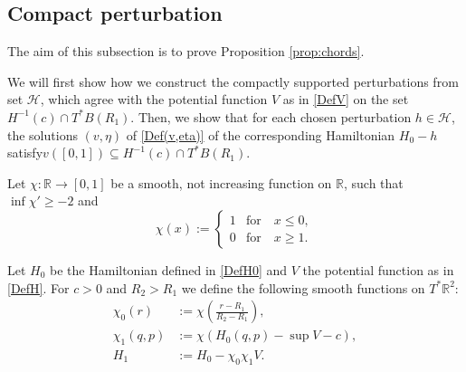 \documentclass[a4paper]{amsart}
\newtheorem{lem}[thm]{Lemma}%
\numberwithin{equation}{section}
\newcommand{\R}{\mathbb{R}}
\newcommand{\A}{\mathcal{A}}
\newcommand{\Crit}{\operatorname{Crit}}
\begin{document}
\subsection{Compact perturbation}
The aim of this subsection is to prove Proposition \ref{prop:chords}.

We will first show how we construct the compactly supported perturbations from set $\mathcal{H}$, which agree with the potential function $V$ as in \eqref{DefV} on the set\linebreak $H^{-1}(c)\cap T^*B(R_1)$. %
Then, we show that for each chosen perturbation $h\in \mathcal{H}$, the solutions $(v,\eta)$ of \eqref{Def(v,eta)} of the corresponding Hamiltonian $H_0-h$ satisfy\linebreak $v([0,1])\subseteq H^{-1}(c)\cap T^*B(R_1)$.


Let $\chi:\R \to [0,1]$ be a smooth, not increasing function on $\R$, such that\linebreak $\inf \chi' \geq -2$ and 
\begin{equation}\label{DefChi}
\chi(x):=\begin{cases}
1 & \textrm{for}\quad x\leq 0,\\
0 & \textrm{for}\quad x\geq 1.
\end{cases}
\end{equation}

Let $H_0$ be the Hamiltonian defined in \eqref{DefH0} and $V$ the potential function as in \eqref{DefH}. For $c>0$ and $R_2>R_1$ we define the following smooth functions on $T^*\R^2$:
\begin{align}
\chi_0(r) & :=\chi \left(\frac{r-R_1}{R_2-R_1}\right), \label{DefChi0}\\
\chi_1(q,p) & := \chi(H_0(q,p)-\sup V-c),\label{DefChi1}\\
H_1 &:= H_0 - \chi_0\chi_1 V.\label{DefH1}
\end{align}
\end{document}
